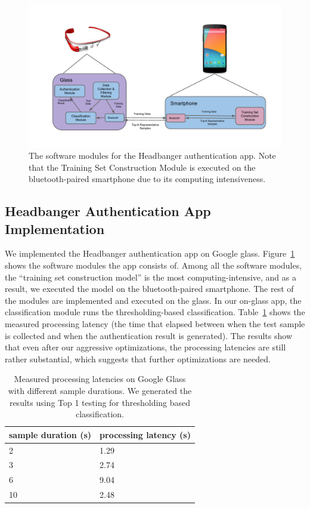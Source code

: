 \begin{figure}[t]
\centering
\includegraphics [width=.75\linewidth]{fig/sofware_architecture}
\caption{The software modules for the Headbanger authentication app. Note that the Training Set Construction Module is executed on the bluetooth-paired smartphone due to its computing intensiveness. \label{fig:software_arch}}
\end{figure}

\subsection{Headbanger Authentication App Implementation}
We implemented the Headbanger authentication app on Google glass. Figure~\ref{fig:software_arch} shows the software modules the app consists of. Among all the software modules, the ``training set construction model'' is the most computing-intensive, and as a result, we executed the model on the bluetooth-paired smartphone. The rest of the modules are implemented and executed on the glass. In our on-glass app, the classification module runs the thresholding-based classification. Table~\ref{tab:glass} shows the measured processing latency (the time that elapsed between when the test sample is collected and when the authentication result is generated). The results show that even after our aggressive optimizations, the processing latencies are still rather substantial, which suggests that further optimizations are needed.

\begin{table}[b]
\small\centering
\begin{tabular}{|l|l|}\hline
sample duration (s) & processing latency (s) \\\hline
2 & 1.29 \\\hline
3 & 2.74 \\\hline
6 & 9.04 \\\hline
10 & 2.48 \\\hline
\end{tabular}
\caption{Measured processing latencies on Google Glass with different sample durations. We generated the results using Top 1 testing for thresholding based classification.\label{tab:glass}}
\end{table}



